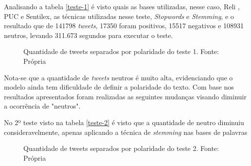 Analisando a tabela \ref{teste-1} é visto quais as bases utilizadas, nesse caso, Reli , PUC e Sentilex, as técnicas utilizadas nesse teste, \textit{Stopwords} e \textit{Stemming}, e o resultado que de 141798 \textit{tweets}, 17350 foram positivos, 15517 negativos e 108931 neutros, levando 311.673 segundos para executar o teste.
\begin{figure}[!h]
	\centering{}
	\caption{Quantidade de tweets separados por polaridade do teste 1. Fonte: Própria}
	\label{uni}
\end{figure}

Nota-se que a quantidade de \textit{tweets} neutros é muito alta, evidenciando que o modelo ainda tem dificuldade de definir a polaridade do texto. Com base nos resultados apresentados foram realizadas as seguintes mudanças visando diminuir a ocorrência de "neutros".
 

\begin{table}[]
	\caption{2º teste}
	\label{teste-2}
\end{table}

No 2º teste visto na tabela \ref{teste-2} é visto que a quantidade de neutro diminuiu consideravelmente, apenas aplicando a técnica de \textit{stemming} nas bases de palavras
\begin{figure}[!h]
	\centering{}
	\caption{Quantidade de tweets separados por polaridade do teste 2. Fonte: Própria}
	\label{uni}
\end{figure}

